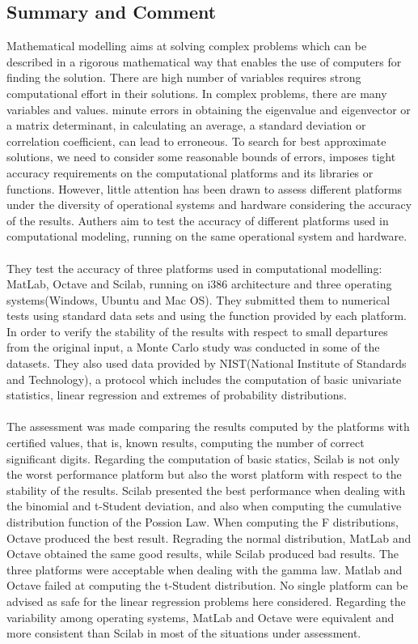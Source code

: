 \documentclass{article}
\begin{document}
\subsection*{Summary and Comment}
Mathematical modelling aims at solving complex problems which can be described in a rigorous mathematical way that enables the use of computers for finding the solution. 
There are high number of variables requires strong computational effort in their solutions. 
In complex problems, there are many variables and values. minute errors in obtaining the eigenvalue and eigenvector or a matrix determinant, in calculating an average, a standard deviation or correlation coefficient, can lead to erroneous.
To search for best approximate solutions, we need to consider some reasonable bounds of errors, imposes tight accuracy requirements on the computational platforms and its libraries or functions.  
However, little attention has been drawn to assess different platforms under the diversity of operational systems and hardware considering the accuracy of the results. 
Authers aim to test the accuracy of different platforms used in computational modeling, running on the same operational system and hardware.\\
\\
They test the accuracy of three platforms used in computational modelling: MatLab, Octave and Scilab, running on i386 architecture and three operating systems(Windows, Ubuntu and Mac OS). They submitted them to numerical tests using standard data sets and using the function provided by each platform. In order to verify the stability of the results with respect to small departures from the original input, a Monte Carlo study was conducted in some of the datasets. They also used data provided by NIST(National Institute of Standards and Technology), a protocol which includes the computation of basic univariate statistics, linear regression and extremes of probability distributions.\\
\\
The assessment was made comparing the results computed by the platforms with certified values, that is, known results, computing the number of correct significant digits. Regarding the computation of basic statics, Scilab is not only the worst performance platform but also the worst platform with respect to the stability of the results. Scilab presented the best performance when dealing with the binomial and t-Student deviation, and also when computing the cumulative distribution function of the Possion Law. When computing the F distributions, Octave produced the best result. Regrading the normal distribution, MatLab and Octave obtained the same good results, while Scilab produced bad results. The three platforms were acceptable when dealing with the gamma law. Matlab and Octave failed at computing the t-Student distribution. No single platform can be advised as safe for the linear regression problems here considered. Regarding the variability among operating systems, MatLab and Octave were equivalent and more consistent than Scilab in most of the situations under assessment.\\
\end{document}
